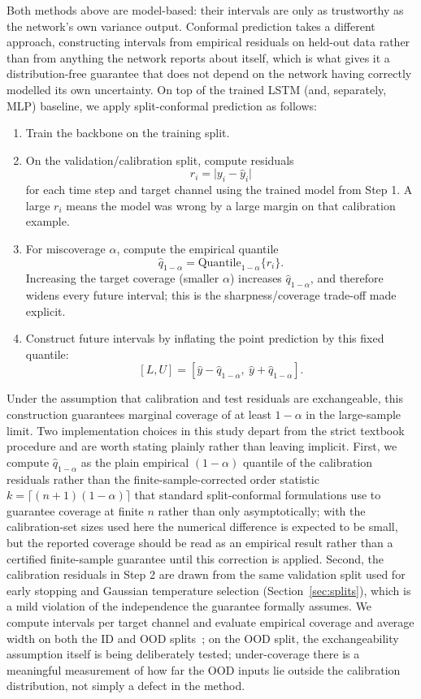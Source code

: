 \documentclass[a4paper,fleqn]{cas-sc}
\begin{document}
Both methods above are model-based: their intervals are only as trustworthy as the network's own variance output. Conformal prediction takes a different approach, constructing intervals from empirical residuals on held-out data rather than from anything the network reports about itself, which is what gives it a distribution-free guarantee that does not depend on the network having correctly modelled its own uncertainty. On top of the trained LSTM (and, separately, MLP) baseline, we apply split-conformal prediction as follows:
\begin{enumerate}
    \item Train the backbone on the training split.
    \item On the validation/calibration split, compute residuals
    \[
    r_i = \bigl|y_i - \hat{y}_i\bigr|
    \]
    for each time step and target channel using the trained model from Step 1. A large $r_i$ means the model was wrong by a large margin on that calibration example.
    \item For miscoverage $\alpha$, compute the empirical quantile
    \[
    \hat{q}_{1-\alpha} = \mathrm{Quantile}_{1-\alpha}\{r_i\}.
    \]
    Increasing the target coverage (smaller $\alpha$) increases $\hat q_{1-\alpha}$, and therefore widens every future interval; this is the sharpness/coverage trade-off made explicit.
    \item Construct future intervals by inflating the point prediction by this fixed quantile:
    \[
    [L, U] = [\hat{y} - \hat{q}_{1-\alpha},\ \hat{y} + \hat{q}_{1-\alpha}].
    \]
\end{enumerate}
Under the assumption that calibration and test residuals are exchangeable, this construction guarantees marginal coverage of at least $1-\alpha$ in the large-sample limit. Two implementation choices in this study depart from the strict textbook procedure and are worth stating plainly rather than leaving implicit. First, we compute $\hat q_{1-\alpha}$ as the plain empirical $(1-\alpha)$ quantile of the calibration residuals rather than the finite-sample-corrected order statistic $k = \lceil (n+1)(1-\alpha) \rceil$ that standard split-conformal formulations use to guarantee coverage at finite $n$ rather than only asymptotically; with the calibration-set sizes used here the numerical difference is expected to be small, but the reported coverage should be read as an empirical result rather than a certified finite-sample guarantee until this correction is applied. Second, the calibration residuals in Step 2 are drawn from the same validation split used for early stopping and Gaussian temperature selection (Section~\ref{sec:splits}), which is a mild violation of the independence the guarantee formally assumes. We compute intervals per target channel and evaluate empirical coverage and average width on both the ID and OOD splits~\cite{stankeviciute2021conformal}; on the OOD split, the exchangeability assumption itself is being deliberately tested; under-coverage there is a meaningful measurement of how far the OOD inputs lie outside the calibration distribution, not simply a defect in the method.
\end{document}
